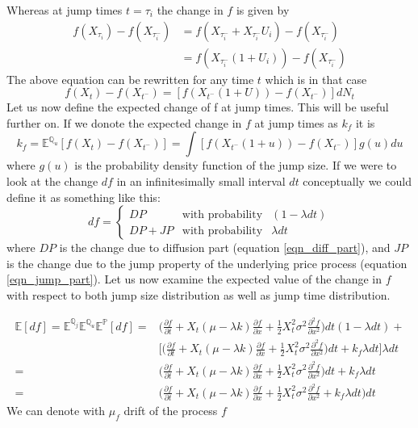 \documentclass[times, utf8, diplomski]{fer}
\begin{document}
\noindent Whereas at jump times $t = \tau_i$ the change in $f$ is given by 
\begin{equation}
\begin{split}
	f(X_{\tau_i}) - f(X_{\tau_i^-}) &= f(X_{\tau_i^-} + X_{\tau_i^-}U_i) - f(X_{\tau_i^-}) \\
	   &= f(X_{\tau_i^-}(1+U_i)) - f(X_{\tau_i^-})
\end{split}
\end{equation}
The above equation can be rewritten for any time $t$ which is in that case
\begin{equation} \label{eqn_jump_part}
	f(X_t) - f(X_{t^-}) = [f(X_{t^-}(1 + U)) - f(X_{t^-})]dN_t
\end{equation}
Let us now define the expected change of f at jump times. This will be useful further on. If we donote the expected change in $f$ at jump times as $k_f$ it is
\begin{equation}
	k_f = \mathbb{E}^{\mathbb{Q}_u}[f(X_t) - f(X_{t^-})] = \int[f(X_{t^-}(1 + u)) - f(X_{t^-})]g(u)du
\end{equation} where $g(u)$ is the probability density function of the jump size.
If we were to look at the change $df$ in an infinitesimally small interval $dt$ conceptually we could define it as something like this:
$$
	df = \left\{  \begin{array}{lcl} DP & \mbox{with probability} & (1 - \lambda dt) \\
			  DP + JP & \mbox{with probability} & \lambda dt \end{array} \right. 
$$ where $DP$ is the change due to diffusion part (equation \ref{eqn_diff_part}), and $JP$ is the change due to the jump property of the underlying price process (equation \ref{eqn_jump_part}). Let us now examine the expected value of the change in $f$ with respect to both jump size distribution as well as jump time distribution. 

\begin{align*}
\mathbb{E}[df] = \mathbb{E}^{\mathbb{Q}_j}\mathbb{E}^{\mathbb{Q}_u}\mathbb{E}^{\mathbb{P}}[df] =& \bigg(\frac{\partial f}{\partial t} + X_t(\mu - \lambda k)\frac{\partial f}{\partial x} + \frac{1}{2}X_t^2\sigma^2\frac{\partial^2 f}{\partial x^2}\bigg)dt(1-\lambda dt) + \\
& \bigg[\bigg(\frac{\partial f}{\partial t} + X_t(\mu - \lambda k)\frac{\partial f}{\partial x} + \frac{1}{2}X_t^2\sigma^2\frac{\partial^2 f}{\partial x^2}\bigg)dt + k_f \lambda dt \bigg]\lambda dt \\
=& \bigg(\frac{\partial f}{\partial t} + X_t(\mu - \lambda k)\frac{\partial f}{\partial x} + \frac{1}{2}X_t^2\sigma^2\frac{\partial^2 f}{\partial x^2}\bigg)dt + k_f \lambda dt \\
=& \bigg(\frac{\partial f}{\partial t} + X_t(\mu - \lambda k)\frac{\partial f}{\partial x} + \frac{1}{2}X_t^2\sigma^2\frac{\partial^2 f}{\partial x^2} + k_f \lambda dt\bigg)dt
\end{align*}
We can denote with $\mu_f$ drift of the process $f$
\end{document}
